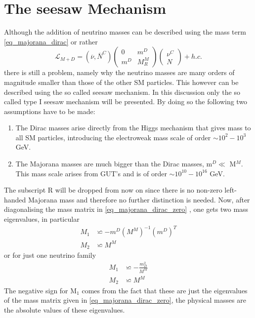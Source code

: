 \section{The seesaw Mechanism}
Although the addition of neutrino masses can be described using the mass term \ref{eq_majorana_dirac} or rather
\begin{equation}
\mathcal{L}_{M+D}=\left(\overline{\nu},\overline{N}^C\right)	\left(\begin{array}{cc}0&m^D\\m^D&M^M_R\end{array}\right)	\left(\begin{array}{c}\nu^C\\N\end{array}\right)+h.c.
\label{eq_majorana_dirac_zero}
\end{equation}
there is still a problem, namely why the neutrino masses are many orders of magnitude smaller than those of the other SM particles. This however can be described using the so called seesaw mechanism. In this discussion only the so called type I seesaw mechanism will be presented. By doing so the following two assumptions have to be made:
\begin{enumerate}
	\item The Dirac masses arise directly from the Higgs mechanism that gives mass to all SM particles, introducing the electroweak mass scale of order $\sim10^2-10^3$ GeV.
	\item The Majorana masses are much bigger than the Dirac masses, m$^D\ll$ M$^M$. This mass scale arises from GUT's and is of order $\sim10^{10}-10^{16}$ GeV.
\end{enumerate}
The subscript R will be dropped from now on since there is no non-zero left-handed Majorana mass and therefore no further distinction is needed.\newline
Now, after diagonalising the mass matrix in \ref{eq_majorana_dirac_zero} \cite[pp. 2-3]{Lindner:2001hr}, one gets two mass eigenvalues, in particular
\begin{align*}
	M_1&\backsimeq-m^D{\left(M^M\right)}^{-1}{\left(m^D\right)}^{T}\\
	M_2&\backsimeq M^M
\end{align*}
or for just one neutrino family
\begin{align}
	M_1&\backsimeq -\frac{m_D^2}{M^M}
	\label{eq:light_neutrino}
	\\
	M_2&\backsimeq M^M
	\label{eq:heavy_neutrino}
\end{align}
The negative sign for M$_1$ comes from the fact that these are just the eigenvalues of the mass matrix given in \ref{eq_majorana_dirac_zero}, the physical masses are the absolute values of these eigenvalues. \newline
